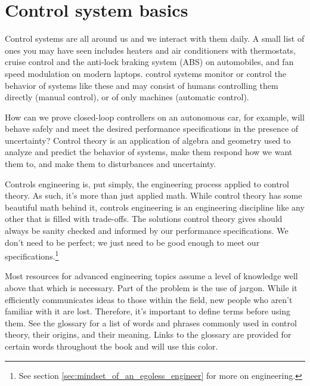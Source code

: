 
\chapter{Control system basics}

Control systems are all around us and we interact with them daily. A small list
of ones you may have seen includes heaters and air conditioners with
thermostats, cruise control and the anti-lock braking system (ABS) on
automobiles, and fan speed modulation on modern laptops. \Glspl{control system}
monitor or control the behavior of \glspl{system} like these and may consist of
humans controlling them directly (manual control), or of only machines
(automatic control).

How can we prove closed-loop \glspl{controller} on an autonomous car, for
example, will behave safely and meet the desired performance specifications in
the presence of uncertainty? Control theory is an application of algebra and
geometry used to analyze and predict the behavior of \glspl{system}, make them
respond how we want them to, and make them  to
\glspl{disturbance} and uncertainty.

Controls engineering is, put simply, the engineering process applied to control
theory. As such, it's more than just applied math. While control theory has some
beautiful math behind it, controls engineering is an engineering discipline like
any other that is filled with trade-offs. The solutions control theory gives
should always be sanity checked and informed by our performance specifications.
We don't need to be perfect; we just need to be good enough to meet our
specifications.\footnote{See section \ref{sec:mindset_of_an_egoless_engineer}
for more on engineering.}
\begin{remark}
  Most resources for advanced engineering topics assume a level of knowledge
  well above that which is necessary. Part of the problem is the use of jargon.
  While it efficiently communicates ideas to those within the field, new people
  who aren't familiar with it are lost. Therefore, it's important to define
  terms before using them. See the glossary for a list of words and phrases
  commonly used in control theory, their origins, and their meaning. Links to
  the glossary are provided for certain words throughout the book and will use
  \textcolor{glscolor}{this color}.
\end{remark}

\renewcommand*{\chapterpath}{\partpath/control-system-basics}




